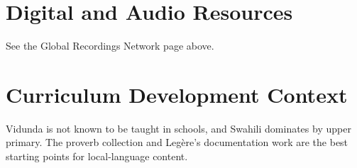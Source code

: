 \documentclass[12pt]{article}
\begin{document}
\section{Digital and Audio Resources}
See the Global Recordings Network page above.

\section{Curriculum Development Context}
Vidunda is not known to be taught in schools, and Swahili dominates by upper primary. The proverb collection and Legère's documentation work are the best starting points for local-language content.
\end{document}
